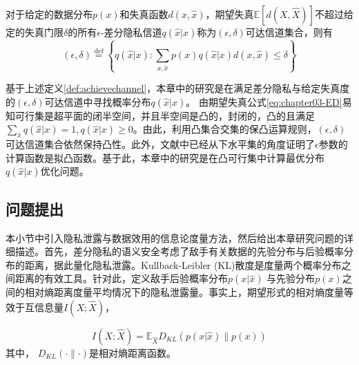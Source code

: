 \begin{definition}\label{def:achievechannel}对于给定的数据分布$p(x)$和失真函数$d(x,\hat{x})$，期望失真$\mathbb{E}\left[d(X,\hat{X})\right]$不超过给定的失真门限$\delta$的所有$\epsilon$-差分隐私信道$q(\hat{x}|x)$称为$(\epsilon,\delta)$可达信道集合，则有
	\begin{equation}
		(\epsilon,\delta)\stackrel{\text{def}}{=} \left\{q(\hat{x}|x):\sum_{x,\hat{x}}p(x)q(\hat{x}|x)d(x,\hat{x})\leq \delta\right\}
	\end{equation}
\end{definition}

基于上述定义\ref{def:achievechannel}，本章中的研究是在满足差分隐私与给定失真度的$(\epsilon,\delta)$可达信道中寻找概率分布$q(\hat{x}|x)$。 由期望失真公式\ref{eq:chapter03-ED}易知可行集是超平面的闭半空间，并且半空间是凸的\cite{boyd2004convex}，封闭的，凸的且满足$\sum_{\hat{x}}q(\hat{x}|x)=1, q(\hat{x}|x)\geq 0$。由此，利用凸集合交集的保凸运算规则，$(\epsilon,\delta)$可达信道集合依然保持凸性。此外，文献中已经从下水平集的角度证明了$\epsilon$参数的计算函数是拟凸函数。基于此，本章中的研究是在凸可行集中计算最优分布$q(\hat{x}|x)$优化问题。



\subsection{问题提出}\label{chapter05-problem-statement}

本小节中引入隐私泄露与数据效用的信息论度量方法，然后给出本章研究问题的详细描述。首先，差分隐私的语义安全考虑了敌手有关数据的先验分布与后验概率分布的距离，据此量化隐私泄露。Kullback-Leibler (KL)散度是度量两个概率分布之间距离的有效工具\cite{cover2006elements}。针对此，定义敌手后验概率分布$p(x|\hat{x})$ 与先验分布$p(x)$之间的相对熵距离度量平均情况下的隐私泄露量。事实上，期望形式的相对熵度量等效于互信息量$I(X;\hat{X})$\cite{calmon2012privacy}，

\begin{equation}\label{chapter05-privacy-metrics}
	I(X;\hat{X})=\mathbb{E}_{\hat{X}}D_{KL}\left(p(x|\hat{x})\parallel p(x)\right)
\end{equation}
其中， $D_{KL}(\cdot \parallel \cdot)$是相对熵距离函数。

